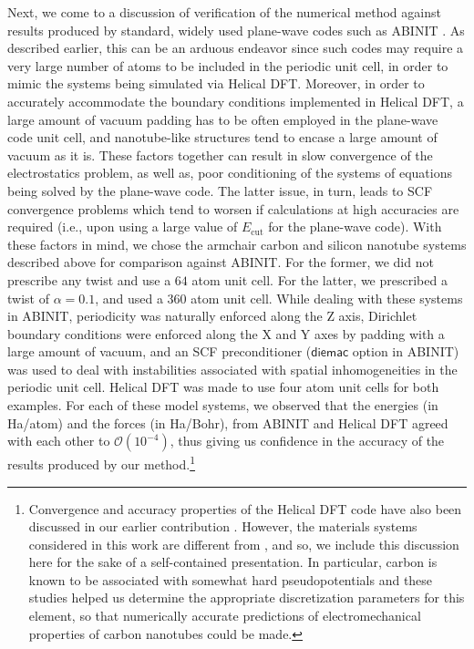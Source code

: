 \documentclass[preprint,12pt, 3p, sort&compress]{elsarticle}
\begin{document}
Next, we come to a discussion of verification of the numerical method against results produced by standard, widely used plane-wave codes such as ABINIT \citep{Gonze_ABINIT_1, gonze2016recent}. As described earlier, this can be an arduous endeavor since such codes may require a very large number of atoms to be included in the periodic unit cell, in order to mimic the systems being simulated via Helical DFT. Moreover, in order to accurately accommodate the boundary conditions implemented in Helical DFT, a large amount of vacuum padding has to be often employed in the plane-wave code unit cell, and  nanotube-like structures tend to encase a large amount of vacuum as it is. These factors together can result in slow convergence of the electrostatics problem, as well as, poor conditioning of the systems of equations being solved by the plane-wave code. The latter issue, in turn, leads to SCF convergence problems which tend to worsen if calculations at high accuracies are required (i.e., upon using a large value of $E_{\text{cut}}$ for the plane-wave code). With these factors in mind, we chose the  armchair carbon and silicon nanotube systems described above for comparison against ABINIT. For the former, we did not prescribe any twist and use a $64$ atom unit cell. For the latter, we prescribed a twist of $\alpha = 0.1$, and used a $360$ atom unit cell. While dealing with these systems in ABINIT, periodicity was naturally enforced along the Z axis, Dirichlet boundary conditions were enforced along the X and Y axes by padding with a large amount of vacuum, and an SCF preconditioner ($\mathsf{diemac}$ option in ABINIT) was used to deal with instabilities associated with spatial inhomogeneities in the periodic unit cell. Helical DFT was made to use four atom unit cells for both examples. For each of these model systems, we observed that the energies (in Ha/atom) and the forces (in Ha/Bohr),  from ABINIT and Helical DFT agreed with each other to $\mathcal{O}(10^{-4})$, thus giving us confidence in the accuracy of the results produced by our method.\footnote{{Convergence and accuracy properties of the Helical DFT code have also been discussed in our earlier contribution \citep{banerjee2021ab}. However, the materials systems considered in this work are different from \citep{banerjee2021ab}, and so, we include this discussion here for the sake of a self-contained presentation. In particular, carbon is known to be associated with somewhat hard pseudopotentials and these studies helped us determine the appropriate discretization parameters for this element, so that numerically accurate predictions of electromechanical properties of carbon nanotubes could be made.}}
\end{document}
